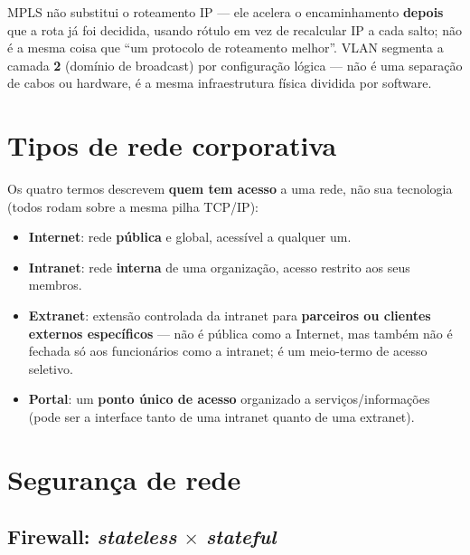 \begin{cuidado}
MPLS não substitui o roteamento IP --- ele acelera o encaminhamento
\textbf{depois} que a rota já foi decidida, usando rótulo em vez de
recalcular IP a cada salto; não é a mesma coisa que “um protocolo de
roteamento melhor”. VLAN segmenta a camada \textbf{2} (domínio de
broadcast) por configuração lógica --- não é uma separação de cabos ou
hardware, é a mesma infraestrutura física dividida por software.
\end{cuidado}

\section{Tipos de rede corporativa}

\begin{conceito}
Os quatro termos descrevem \textbf{quem tem acesso} a uma rede, não sua
tecnologia (todos rodam sobre a mesma pilha TCP/IP):
\begin{itemize}
\item \textbf{Internet}: rede \textbf{pública} e global, acessível a
qualquer um.
\item \textbf{Intranet}: rede \textbf{interna} de uma organização, acesso
restrito aos seus membros.
\item \textbf{Extranet}: extensão controlada da intranet para
\textbf{parceiros ou clientes externos específicos} --- não é pública como
a Internet, mas também não é fechada só aos funcionários como a intranet;
é um meio-termo de acesso seletivo.
\item \textbf{Portal}: um \textbf{ponto único de acesso} organizado a
serviços/informações (pode ser a interface tanto de uma intranet quanto de
uma extranet).
\end{itemize}
\end{conceito}

\section{Segurança de rede}

\subsection{Firewall: \textit{stateless} $\times$ \textit{stateful}}

